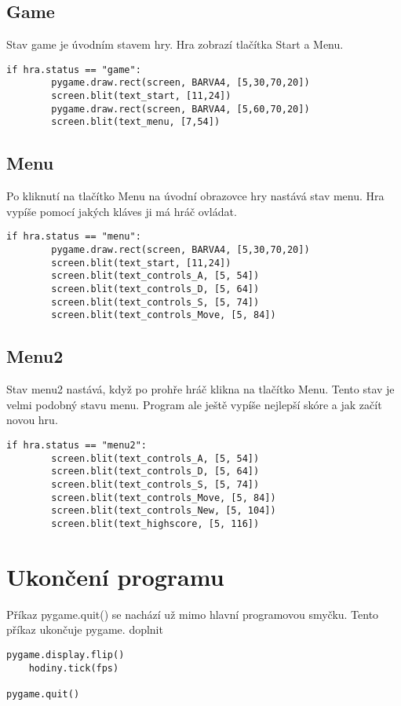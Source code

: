 \documentclass[12pt]{report}			%
\begin{document}
			\subsection{Game}
Stav game je úvodním stavem hry. Hra zobrazí tlačítka Start a Menu.
\begin{lstlisting}[title={Program tetris.py}, caption={Stav "game"}, 							label={lst:tetris.py}]
    if hra.status == "game":
        pygame.draw.rect(screen, BARVA4, [5,30,70,20])
        screen.blit(text_start, [11,24])
        pygame.draw.rect(screen, BARVA4, [5,60,70,20])
        screen.blit(text_menu, [7,54])
\end{lstlisting}
			\subsection{Menu}
Po kliknutí na tlačítko Menu na úvodní obrazovce hry nastává stav menu. Hra vypíše pomocí jakých kláves ji má hráč ovládat.
\begin{lstlisting}[title={Program tetris.py}, caption={Stav "menu"}, 							label={lst:tetris.py}]
    if hra.status == "menu":
        pygame.draw.rect(screen, BARVA4, [5,30,70,20])
        screen.blit(text_start, [11,24])
        screen.blit(text_controls_A, [5, 54])
        screen.blit(text_controls_D, [5, 64])
        screen.blit(text_controls_S, [5, 74])
        screen.blit(text_controls_Move, [5, 84])
\end{lstlisting}
			\subsection{Menu2}
Stav menu2 nastává, když po prohře hráč klikna na tlačítko Menu. Tento stav je velmi podobný stavu menu. Program ale ještě vypíše nejlepší skóre a jak začít novou hru.
\begin{lstlisting}[title={Program tetris.py}, caption={Stav "menu2"}, 							label={lst:tetris.py}]
    if hra.status == "menu2":
        screen.blit(text_controls_A, [5, 54])
        screen.blit(text_controls_D, [5, 64])
        screen.blit(text_controls_S, [5, 74])
        screen.blit(text_controls_Move, [5, 84])
        screen.blit(text_controls_New, [5, 104])
        screen.blit(text_highscore, [5, 116])
\end{lstlisting}
		\section{Ukončení programu}
Příkaz pygame.quit() se nachází už mimo hlavní programovou smyčku. Tento příkaz ukončuje pygame.
doplnit
\begin{lstlisting}[title={Program tetris.py}, caption={Ukončení programu}, 							label={lst:tetris.py}]
    pygame.display.flip()
    hodiny.tick(fps)

pygame.quit()
\end{lstlisting}
\end{document}
